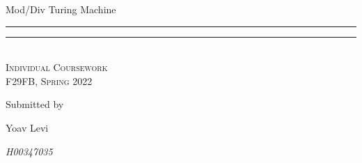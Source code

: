 \documentclass{article} %
\newlength{\drop}
\begin{document}
    \begin{titlepage}
        \textheight
        \centering
        \vspace*{\baselineskip}
        {\LARGE Mod/Div Turing Machine }\\[0.2\baselineskip]
        \rule{\textwidth}{0.4pt}\vspace*{-\baselineskip}\vspace{3.2pt}
        \rule{\textwidth}{1.6pt}\\[\baselineskip]
        \scshape
        Individual Coursework\\
        F29FB, Spring 2022\par
        \vfill
        Submitted by \\[\baselineskip]
        {\Large Yoav Levi\par}
        {\itshape H00347035\par}
        \vspace*{8\baselineskip}
    \end{titlepage}
\end{document}
